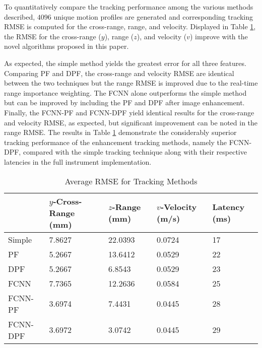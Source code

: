 \documentclass[10pt,journal,final]{IEEEtran}
\begin{document}
To quantitatively compare the tracking performance among the various methods described, $4096$ unique motion profiles are generated and corresponding tracking RMSE is computed for the cross-range, range, and velocity. Displayed in Table \ref{table:tracking_rmse2}, the RMSE for the cross-range ($y$), range ($z$), and velocity ($v$) improve with the novel algorithms proposed in this paper. 

As expected, the simple method yields the greatest error for all three features. Comparing PF and DPF, the cross-range and velocity RMSE are identical between the two techniques but the range RMSE is improved due to the real-time range importance weighting. The FCNN alone outperforms the simple method but can be improved by including the PF and DPF after image enhancement. Finally, the FCNN-PF and FCNN-DPF yield identical results for the cross-range and velocity RMSE, as expected, but significant improvement can be noted in the range RMSE. The results in Table \ref{table:tracking_rmse2} demonstrate the considerably superior tracking performance of the enhancement tracking methods, namely the FCNN-DPF, compared with the simple tracking technique along with their respective latencies in the full instrument implementation.

\begin{table} [h]
	\caption{Average RMSE for Tracking Methods}
	\centering
	\begin{tabular}{ m{5em} || m{5em} m{5em} m{5em} m{4em} }
		\hline
		& $y$-Cross-Range (mm) & $z$-Range (mm) & $v$-Velocity (m/s) & Latency (ms) \\
		\hline\hline
		Simple & 7.8627 & 22.0393 & 0.0724 & 17 \\
		\hline
		PF & 5.2667 & 13.6412 & 0.0529 & 22 \\
		\hline
		DPF & 5.2667 & 6.8543 & 0.0529 & 23 \\
		\hline
		FCNN & 7.7365 & 12.2636 & 0.0584 & 25 \\
		\hline
		FCNN-PF & 3.6974 & 7.4431 & 0.0445 & 28 \\
		\hline
		FCNN-DPF & 3.6972 & 3.0742 & 0.0445 & 29 \\
		\hline
	\end{tabular}
	\label{table:tracking_rmse2}
\end{table}

\end{document}
